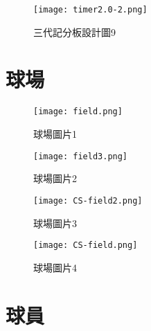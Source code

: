 \begin{figure}
  \centering
  \texttt{[image: timer2.0-2.png]}
  \caption{三代記分板設計圖9}
  \label{fig:example}
\end{figure}

\section{球場}

\begin{figure}
  \centering
  \texttt{[image: field.png]}
  \caption{球場圖片1}
  \label{fig:example}
\end{figure}


\begin{figure}
  \centering
  \texttt{[image: field3.png]}
  \caption{球場圖片2}
  \label{fig:example}
\end{figure}


\begin{figure}
  \centering
  \texttt{[image: CS-field2.png]}
  \caption{球場圖片3}
  \label{fig:example}
\end{figure}


\begin{figure}
  \centering
  \texttt{[image: CS-field.png]}
  \caption{球場圖片4}
  \label{fig:example}
\end{figure}
\section{球員}